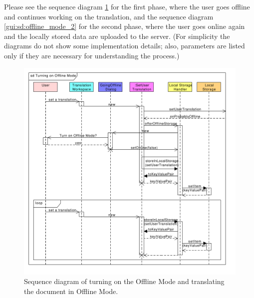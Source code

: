 Please see the sequence diagram \ref{gui:sd:offline_mode_1} for the first phase, where the user goes offline and continues working on the translation, and the sequence diagram \ref{gui:sd:offline_mode_2} for the second phase, where the user goes online again and the locally stored data are uploaded to the server.
(For simplicity the diagrams do not show some implementation details;
also, parameters are listed only if they are necessary for understanding the process.)

\begin{figure}[h]
\begin{center}
\includegraphics[scale=0.55]{figures/offline_mode_1.pdf}
\end{center}
\caption{Sequence diagram of turning on the Offline Mode and translating the document in Offline Mode.}\label{gui:sd:offline_mode_1}
\end{figure}

